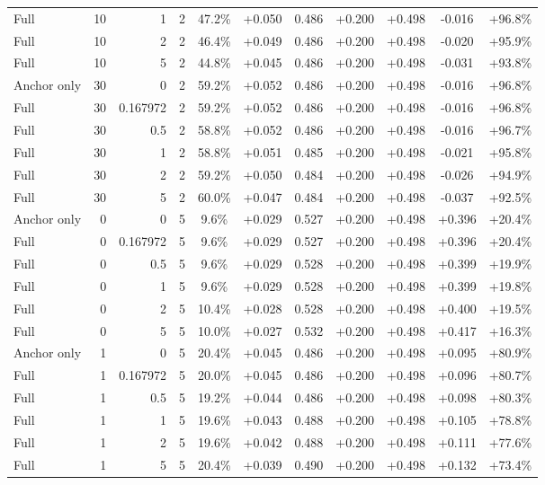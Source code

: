\begin{table}[htbp]
\begin{tabular}{lrrrccccccc}
Full & 10 & 1 & 2 & 47.2\% & +0.050 & 0.486 & +0.200 & +0.498 & -0.016 & +96.8\% \\
Full & 10 & 2 & 2 & 46.4\% & +0.049 & 0.486 & +0.200 & +0.498 & -0.020 & +95.9\% \\
Full & 10 & 5 & 2 & 44.8\% & +0.045 & 0.486 & +0.200 & +0.498 & -0.031 & +93.8\% \\
Anchor only & 30 & 0 & 2 & 59.2\% & +0.052 & 0.486 & +0.200 & +0.498 & -0.016 & +96.8\% \\
Full & 30 & 0.167972 & 2 & 59.2\% & +0.052 & 0.486 & +0.200 & +0.498 & -0.016 & +96.8\% \\
Full & 30 & 0.5 & 2 & 58.8\% & +0.052 & 0.486 & +0.200 & +0.498 & -0.016 & +96.7\% \\
Full & 30 & 1 & 2 & 58.8\% & +0.051 & 0.485 & +0.200 & +0.498 & -0.021 & +95.8\% \\
Full & 30 & 2 & 2 & 59.2\% & +0.050 & 0.484 & +0.200 & +0.498 & -0.026 & +94.9\% \\
Full & 30 & 5 & 2 & 60.0\% & +0.047 & 0.484 & +0.200 & +0.498 & -0.037 & +92.5\% \\
Anchor only & 0 & 0 & 5 & 9.6\% & +0.029 & 0.527 & +0.200 & +0.498 & +0.396 & +20.4\% \\
Full & 0 & 0.167972 & 5 & 9.6\% & +0.029 & 0.527 & +0.200 & +0.498 & +0.396 & +20.4\% \\
Full & 0 & 0.5 & 5 & 9.6\% & +0.029 & 0.528 & +0.200 & +0.498 & +0.399 & +19.9\% \\
Full & 0 & 1 & 5 & 9.6\% & +0.029 & 0.528 & +0.200 & +0.498 & +0.399 & +19.8\% \\
Full & 0 & 2 & 5 & 10.4\% & +0.028 & 0.528 & +0.200 & +0.498 & +0.400 & +19.5\% \\
Full & 0 & 5 & 5 & 10.0\% & +0.027 & 0.532 & +0.200 & +0.498 & +0.417 & +16.3\% \\
Anchor only & 1 & 0 & 5 & 20.4\% & +0.045 & 0.486 & +0.200 & +0.498 & +0.095 & +80.9\% \\
Full & 1 & 0.167972 & 5 & 20.0\% & +0.045 & 0.486 & +0.200 & +0.498 & +0.096 & +80.7\% \\
Full & 1 & 0.5 & 5 & 19.2\% & +0.044 & 0.486 & +0.200 & +0.498 & +0.098 & +80.3\% \\
Full & 1 & 1 & 5 & 19.6\% & +0.043 & 0.488 & +0.200 & +0.498 & +0.105 & +78.8\% \\
Full & 1 & 2 & 5 & 19.6\% & +0.042 & 0.488 & +0.200 & +0.498 & +0.111 & +77.6\% \\
Full & 1 & 5 & 5 & 20.4\% & +0.039 & 0.490 & +0.200 & +0.498 & +0.132 & +73.4\% \\

\end{tabular}
\end{table}
